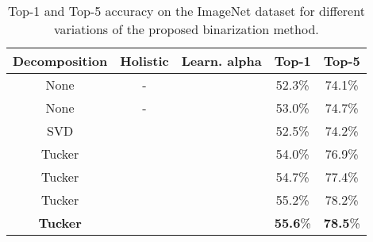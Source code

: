 \documentclass[10pt,twocolumn,letterpaper]{article}
\newcommand{\xmark}{\ding{55}}
\begin{document}
\begin{table}[!htbp]
\small
	\begin{center}
		\begin{tabular}{|c|c|c|c|c|}
			\hline
			Decomposition & Holistic & Learn. alpha & Top-1 & Top-5 \\
			\hline\hline
			None & - & \xmark  & 52.3\% & 74.1\% \\
			None & - & \checkmark  & 53.0\% & 74.7\% \\
			SVD & \xmark & \checkmark  & 52.5\% & 74.2\% \\
			Tucker & \xmark & \xmark  & 54.0\% & 76.9\% \\
			Tucker & \xmark & \checkmark  & 54.7\%&  77.4\%\\
			Tucker & \checkmark & \xmark  & 55.2\% &  78.2\% \\
			\textbf{Tucker} & \checkmark & \checkmark  & \textbf{55.6}\% & \textbf{78.5}\% \\
            \hline
		\end{tabular}
	\end{center}
	\caption{Top-1 and Top-5 accuracy on the ImageNet dataset for different variations of the proposed binarization method.}
	\label{tab:main-results-imagenet}
\end{table}
\end{document}

